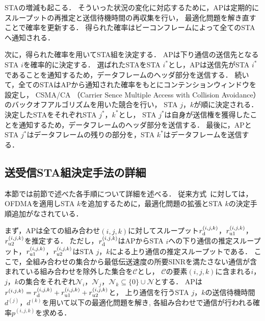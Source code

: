 \documentclass[technicalreport]{ieicej}
\newcommand{\sijk}{(i,j,k)}
\newcommand{\rijk}{r^{(i,j,k)}}
\newcommand{\mthc}{\mathcal C}
\newcommand{\mthni}{{\mathcal N}_i}
\newcommand{\mthnj}{{\mathcal N}_j}
\newcommand{\mthnk}{{\mathcal N}_k}
\begin{document}
		STAの増減も起こる．
		そういった状況の変化に対応するために，APは定期的にスループットの再推定と送信待機時間の再収集を行い，
		最適化問題を解き直すことで確率を更新する．
		得られた確率はビーコンフレームによって全てのSTAへ通知される．
		\par
		次に，得られた確率を用いてSTA組を決定する．
		APは下り通信の送信先となるSTA $i$を確率的に決定する．
		選ばれたSTAをSTA $i^*$とし，APは送信先がSTA $i^*$であることを通知するため，データフレームのヘッダ部分を送信する．
		続いて，全てのSTAはAPから通知された確率をもとにコンテンションウィンドウを設定し，
		CSMA/CA （Carrier Sence Multiple Access with Collision Avoidance）のバックオフアルゴリズムを用いた競合を行い，
		STA $j$，$k$が順に決定される．
		決定したSTAをそれぞれSTA $j^*$，$k^*$とし，
		STA $j^*$は自身が送信権を獲得したことを通知するため，データフレームのヘッダ部分を送信する．
		最後に，APとSTA $j^*$はデータフレームの残りの部分を，STA $k^*$はデータフレームを送信する．

	\subsection{送受信STA組決定手法の詳細}
		本節では前節で述べた各手順について詳細を述べる．
		従来方式~\cite{promac_fair}に対しては，OFDMAを適用しSTA $k$を追加するために，最適化問題の拡張とSTA $k$の決定手順追加がなされている．
		\par
		まず，APは全ての組み合わせ$(i,j,k)$に対してスループット$r^{(i,j,k)}_{\rm d}$，$r^{(i,j,k)}_{\rm u1}$，$r^{(i,j,k)}_{\rm u2}$を推定する．
		ただし，$r^{(i,j,k)}_{\rm d}$はAPからSTA $i$への下り通信の推定スループット，$r^{(i,j,k)}_{\rm u1}$，$r^{(i,j,k)}_{\rm u2}$はSTA $j$，$k$による上り通信の推定スループットである．
		ここで，全組み合わせの集合から最低伝送速度の所要SINRを満たさない通信が含まれている組み合わせを除外した集合を$\mthc$とし，
		$\mthc$の要素$\sijk$に含まれる$i$，$j$，$k$の集合をそれぞれ$\mthni$，$\mthnj$，$\mthnk\subseteq \{0\}\cup{\mathcal N}$とする．
		APは$\rijk=r^{(i,j,k)}_{\rm d}+r^{(i,j,k)}_{\rm u1}+r^{(i,j,k)}_{\rm u2}$と，
		上り通信を行うSTA $j$，$k$の送信待機時間$d^{(j)}$，$d^{(k)}$を用いて以下の最適化問題を解き,
		各組み合わせで通信が行われる確率$p^{(i,j,k)}$を求める．
\end{document}
